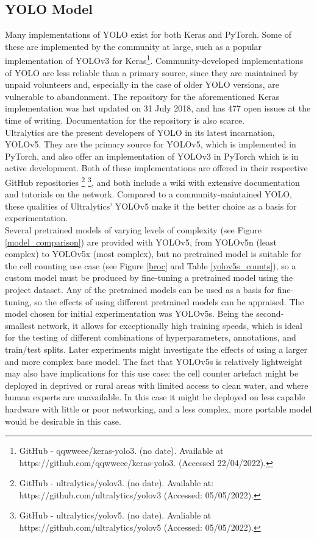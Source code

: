 \subsection{YOLO Model}
Many implementations of YOLO exist for both Keras and PyTorch. Some of these are implemented by the community at large, such as a popular implementation of YOLOv3 for Keras\footnote{GitHub - qqwweee/keras-yolo3. (no date). Available at https://github.com/qqwweee/keras-yolo3. (Accessed 22/04/2022).}. Community-developed implementations of YOLO are less reliable than a primary source, since they are maintained by unpaid volunteers and, especially in the case of older YOLO versions, are vulnerable to abandonment. The repository for the aforementioned Keras implementation was last updated on 31 July 2018, and has 477 open issues at the time of writing. Documentation for the repository is also scarce.\\

Ultralytics are the present developers of YOLO in its latest incarnation, YOLOv5. They are the primary source for YOLOv5, which is implemented in PyTorch, and also offer an implementation of YOLOv3 in PyTorch which is in active development. Both of these implementations are offered in their respective GitHub repositories \footnote{GitHub - ultralytics/yolov3. (no date). Available at: https://github.com/ultralytics/yolov3 (Accessed: 05/05/2022).} \footnote{GitHub - ultralytics/yolov5. (no date). Avaliable at https://github.com/ultralytics/yolov5 (Accessed: 05/05/2022).}, and both include a wiki with extensive documentation and tutorials on the network. Compared to a community-maintained YOLO, these qualities of Ultralytics' YOLOv5 make it the better choice as a basis for experimentation.\\

Several pretrained models of varying levels of complexity (see Figure \ref{model_comparison}) are provided with YOLOv5, from YOLOv5n (least complex) to YOLOv5x (most complex), but no pretrained model is suitable for the cell counting use case (see Figure \ref{broc} and Table \ref{yolov5s_counts}), so a custom model must be produced by fine-tuning a pretrained model using the project dataset. Any of the pretrained models can be used as a basis for fine-tuning, so the effects of using different pretrained models can be appraised. The model chosen for initial experimentation was YOLOv5s. Being the second-smallest network, it allows for exceptionally high training speeds, which is ideal for the testing of different combinations of hyperparameters, annotations, and train/test splits. Later experiments might investigate the effects of using a larger and more complex base model. The fact that YOLOv5s is relatively lightweight may also have implications for this use case: the cell counter artefact might be deployed in deprived or rural areas with limited access to clean water, and where human experts are unavailable. In this case it might be deployed on less capable hardware with little or poor networking, and a less complex, more portable model would be desirable in this case.

